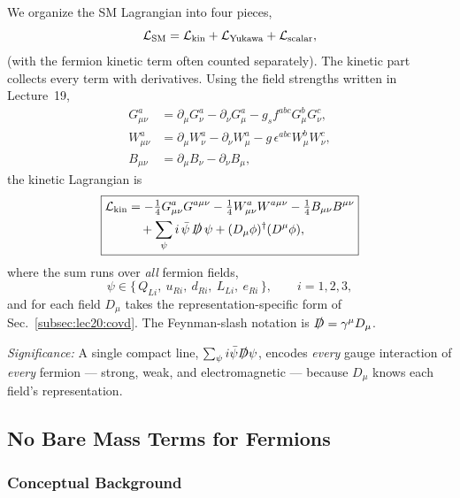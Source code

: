 We organize the SM Lagrangian into four pieces,
\begin{equation}
  \mathcal{L}_{\mathrm{SM}} = \mathcal{L}_{\rm kin} + \mathcal{L}_{\rm Yukawa} + \mathcal{L}_{\rm scalar},
  \label{eq:lec20:lag-pieces}
\end{equation}
(with the fermion kinetic term often counted separately). The kinetic
part collects every term with derivatives. Using the field strengths
written in Lecture~19,
\begin{align}
  G^a_{\mu\nu} &= \partial_\mu G^a_\nu - \partial_\nu G^a_\mu
                  - g_s f^{abc}G^b_\mu G^c_\nu, \\
  W^a_{\mu\nu} &= \partial_\mu W^a_\nu - \partial_\nu W^a_\mu
                  - g\,\epsilon^{abc}W^b_\mu W^c_\nu, \\
  B_{\mu\nu}   &= \partial_\mu B_\nu - \partial_\nu B_\mu,
\end{align}
the kinetic Lagrangian is
\begin{equation}
  \boxed{
  \begin{aligned}
    \mathcal{L}_{\rm kin}
    &= -\tfrac14 G^a_{\mu\nu}G^{a\mu\nu}
       -\tfrac14 W^a_{\mu\nu}W^{a\mu\nu}
       -\tfrac14 B_{\mu\nu}B^{\mu\nu}\\
    &\quad + \sum_{\psi} i\,\bar\psi\,\slashed{D}\,\psi
           + (D_\mu\phi)^\dagger(D^\mu\phi),
  \end{aligned}}
  \label{eq:lec20:kinetic}
\end{equation}
where the sum runs over \emph{all} fermion fields,
\begin{equation}
  \psi \in \{\,Q_{Li},\ u_{Ri},\ d_{Ri},\ L_{Li},\ e_{Ri}\,\},
  \qquad i=1,2,3,
  \label{eq:lec20:psi-sum}
\end{equation}
and for each field $D_\mu$ takes the representation-specific form of
Sec.~\ref{subsec:lec20:covd}. The Feynman-slash notation is
$\slashed{D}=\gamma^\mu D_\mu$.

\textit{Significance:} A single compact line,
$\sum_\psi i\bar\psi\slashed D\psi$, encodes \emph{every} gauge
interaction of \emph{every} fermion --- strong, weak, and
electromagnetic --- because $D_\mu$ knows each field's representation.

\subsection{No Bare Mass Terms for Fermions}\label{subsec:lec20:nomass}

\subsubsection*{Conceptual Background}

